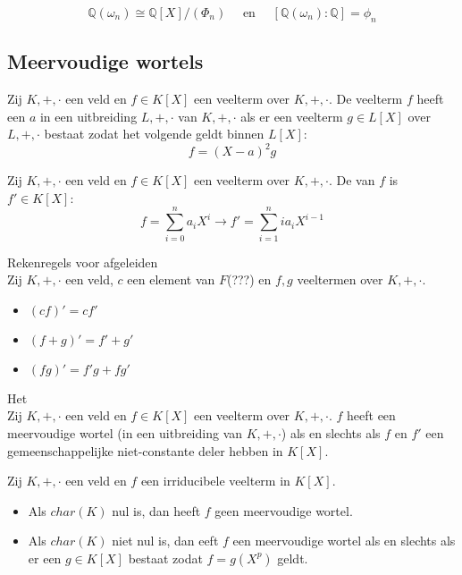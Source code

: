 \documentclass[main.tex]{subfiles}
\begin{document}
\begin{gev}
  \[ \mathbb{Q}(\omega_{n}) \cong \mathbb{Q}[X]/(\Phi_{n}) \quad\text{ en }\quad [\mathbb{Q}(\omega_{n}):\mathbb{Q}] = \phi_{n} \]
\end{gev}

\subsection{Meervoudige wortels}
\label{sec:meervoudige-wortels}

\begin{de}
  Zij $K,+,\cdot$ een veld en $f\in K[X]$ een veelterm over $K,+,\cdot$.
  De veelterm $f$ heeft een  $a$ in een uitbreiding $L,+,\cdot$ van $K,+,\cdot$ als er een veelterm $g\in L[X]$ over $L,+,\cdot$ bestaat zodat het volgende geldt binnen $L[X]$:
  \[ f = (X-a)^{2}g\]
\end{de}

\begin{de}
  Zij $K,+,\cdot$ een veld en $f\in K[X]$ een veelterm over $K,+,\cdot$.
  De  van $f$ is $f'\in K[X]$:
  \[ f= \sum_{i=0}^{n}a_{i}X^{i} \longrightarrow f' = \sum_{i=1}^{n}ia_{i}X^{i-1} \]
\end{de}

\begin{st}
  Rekenregels voor afgeleiden\\
  Zij $K,+,\cdot$ een veld, $c$ een element van $F$(???) en $f,g$ veeltermen over $K,+,\cdot$.
  \begin{itemize}
  \item $(cf)'= cf'$
  \item $(f+g)' = f'+g'$
  \item $(fg)' = f'g+ fg'$
  \end{itemize}
\end{st}

\begin{st}
  Het \\
  Zij $K,+,\cdot$ een veld en $f\in K[X]$ een veelterm over $K,+,\cdot$.
  $f$ heeft een meervoudige wortel (in een uitbreiding van $K,+,\cdot$) als en slechts als $f$ en $f'$ een gemeenschappelijke niet-constante deler hebben in $K[X]$.
\end{st}

\begin{st}
  Zij $K,+,\cdot$ een veld en $f$ een irriducibele veelterm in $K[X]$.
  \begin{itemize}
  \item Als $char(K)$ nul is, dan heeft $f$ geen meervoudige wortel.
  \item Als $char(K)$ niet nul is, dan eeft $f$ een meervoudige wortel als en slechts als er een $g\in K[X]$ bestaat zodat $f=g(X^{p})$ geldt.
  \end{itemize}
\end{st}
\end{document}
